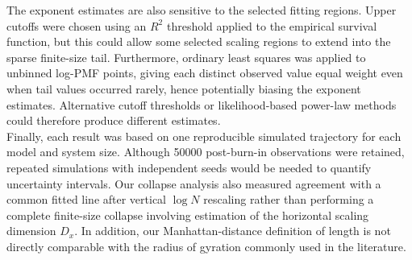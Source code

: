 The exponent estimates are also sensitive to the selected fitting regions. Upper cutoffs were chosen using an $R^2$ threshold applied to the empirical survival function, but this could allow some selected scaling regions to extend into the sparse finite-size tail. Furthermore, ordinary least squares was applied to unbinned log-PMF points, giving each distinct observed value equal weight even when tail values occurred rarely, hence potentially biasing the exponent estimates. Alternative cutoff thresholds or likelihood-based power-law methods could therefore produce different estimates.\\

Finally, each result was based on one reproducible simulated trajectory for each model and system size. Although 50000 post-burn-in observations were retained, repeated simulations with independent seeds would be needed to quantify uncertainty intervals. Our collapse analysis also measured agreement with a common fitted line after vertical $\log N$ rescaling rather than performing a complete finite-size collapse involving estimation of the horizontal scaling dimension $D_x$. In addition, our Manhattan-distance definition of length is not directly comparable with the radius of gyration commonly used in the literature.
